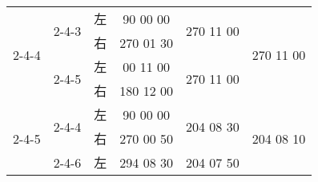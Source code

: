 \documentclass[UTF8]{ctexart}
\begin{document}
\begin{table}[h]
\begin{tabular}{|c|c|c|c|c|c|}
			\multirow{4}{*}{2-4-4}  & \multirow{2}{*}{2-4-3}  & 左                   & 90 00 00                                                                                                 & \multirow{2}{*}{270 11 00}                                                                              & \multirow{4}{*}{270 11 00}                                                                              \\ \cline{3-4}
			&                         & 右                   & 270 01 30                                                                                                &                                                                                                         &                                                                                                         \\ \cline{2-5}
			& \multirow{2}{*}{2-4-5}  & 左                   & 00 11 00                                                                                                 & \multirow{2}{*}{270 11 00}                                                                              &                                                                                                         \\ \cline{3-4}
			&                         & 右                   & 180 12 00                                                                                                &                                                                                                         &                                                                                                         \\ \hline
			\multirow{4}{*}{2-4-5}  & \multirow{2}{*}{2-4-4}  & 左                   & 90 00 00                                                                                                 & \multirow{2}{*}{204 08 30}                                                                              & \multirow{4}{*}{204 08 10}                                                                              \\ \cline{3-4}
			&                         & 右                   & 270 00 50                                                                                                &                                                                                                         &                                                                                                         \\ \cline{2-5}
			& \multirow{2}{*}{2-4-6}  & 左                   & 294 08 30                                                                                                & \multirow{2}{*}{204 07 50}                                                                              &                                                                                                         \\ \cline{3-4}

\end{tabular}
\end{table}
\end{document}
